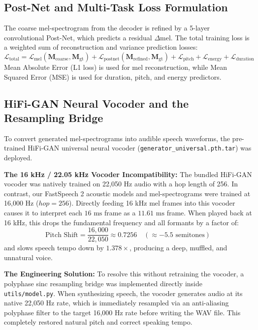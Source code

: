 \documentclass[11pt,a4paper]{article}
\begin{document}
\subsection{Post-Net and Multi-Task Loss Formulation}
The coarse mel-spectrogram from the decoder is refined by a 5-layer convolutional Post-Net, which predicts a residual $\Delta \text{mel}$. The total training loss is a weighted sum of reconstruction and variance prediction losses:
\begin{equation}
    \mathcal{L}_{\text{total}} = \mathcal{L}_{\text{mel}}(\mathbf{M}_{\text{coarse}}, \mathbf{M}_{\text{gt}}) + \mathcal{L}_{\text{postnet}}(\mathbf{M}_{\text{refined}}, \mathbf{M}_{\text{gt}}) + \mathcal{L}_{\text{pitch}} + \mathcal{L}_{\text{energy}} + \mathcal{L}_{\text{duration}}
\end{equation}
Mean Absolute Error (L1 loss) is used for mel reconstruction, while Mean Squared Error (MSE) is used for duration, pitch, and energy predictors.

\subsection{HiFi-GAN Neural Vocoder and the Resampling Bridge}
To convert generated mel-spectrograms into audible speech waveforms, the pre-trained HiFi-GAN universal neural vocoder (\texttt{generator\_universal.pth.tar}) was deployed.

\textbf{The 16 kHz / 22.05 kHz Vocoder Incompatibility:} The bundled HiFi-GAN vocoder was natively trained on 22,050 Hz audio with a hop length of 256. In contrast, our FastSpeech 2 acoustic models and mel-spectrograms were trained at 16,000 Hz ($hop = 256$). Directly feeding 16 kHz mel frames into this vocoder causes it to interpret each $16\text{ ms}$ frame as a $11.61\text{ ms}$ frame. When played back at 16 kHz, this drops the fundamental frequency and all formants by a factor of:
\begin{equation}
    \text{Pitch Shift} = \frac{16,000}{22,050} \approx 0.7256 \quad (\approx -5.5\text{ semitones})
\end{equation}
and slows speech tempo down by $1.378\times$, producing a deep, muffled, and unnatural voice.

\textbf{The Engineering Solution:} To resolve this without retraining the vocoder, a polyphase sinc resampling bridge was implemented directly inside \texttt{utils/model.py}. When synthesizing speech, the vocoder generates audio at its native 22,050 Hz rate, which is immediately resampled via an anti-aliasing polyphase filter to the target 16,000 Hz rate before writing the WAV file. This completely restored natural pitch and correct speaking tempo.
\end{document}
